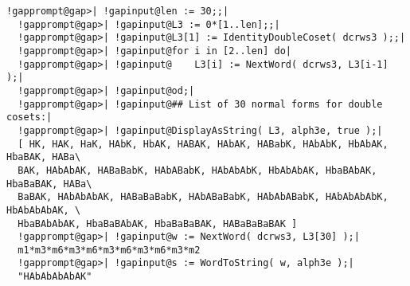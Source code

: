\documentclass[a4paper,11pt]{report}
\begin{document}
{{\begin{Verbatim}[commandchars=!@|,fontsize=\small,frame=single,label=Example]
  !gapprompt@gap>| !gapinput@len := 30;;|
  !gapprompt@gap>| !gapinput@L3 := 0*[1..len];;|
  !gapprompt@gap>| !gapinput@L3[1] := IdentityDoubleCoset( dcrws3 );;|
  !gapprompt@gap>| !gapinput@for i in [2..len] do|
  !gapprompt@gap>| !gapinput@    L3[i] := NextWord( dcrws3, L3[i-1] );|
  !gapprompt@gap>| !gapinput@od;|
  !gapprompt@gap>| !gapinput@## List of 30 normal forms for double cosets:|
  !gapprompt@gap>| !gapinput@DisplayAsString( L3, alph3e, true );|
  [ HK, HAK, HaK, HAbK, HbAK, HABAK, HAbAK, HABabK, HAbAbK, HbAbAK, HbaBAK, HABa\
  BAK, HAbAbAK, HABaBabK, HAbABabK, HAbAbAbK, HbAbAbAK, HbaBAbAK, HbaBaBAK, HABa\
  BaBAK, HAbAbAbAK, HABaBaBabK, HAbABaBabK, HAbAbABabK, HAbAbAbAbK, HbAbAbAbAK, \
  HbaBAbAbAK, HbaBaBAbAK, HbaBaBaBAK, HABaBaBaBAK ]
  !gapprompt@gap>| !gapinput@w := NextWord( dcrws3, L3[30] );|
  m1*m3*m6*m3*m6*m3*m6*m3*m6*m3*m2
  !gapprompt@gap>| !gapinput@s := WordToString( w, alph3e );|
  "HAbAbAbAbAK"
  
\end{Verbatim}
 }

 }

         
\end{document}
